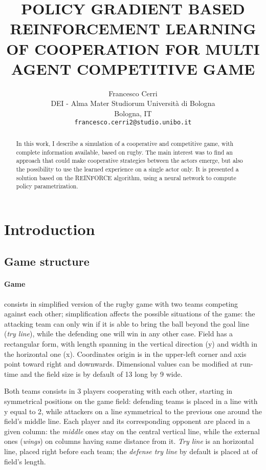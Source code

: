 \documentclass{article}
\title{POLICY GRADIENT BASED REINFORCEMENT LEARNING OF COOPERATION FOR  MULTI AGENT COMPETITIVE GAME}
\author{
  Francesco Cerri\\
  DEI - Alma Mater Studiorum Università di Bologna\\
  Bologna, IT\\
  \texttt{francesco.cerri2@studio.unibo.it} \\
}
\begin{document}
\maketitle

\begin{abstract}
In this work, I describe a simulation of a cooperative and competitive game, with complete information available, based on rugby. The main interest was to find an approach that could make cooperative strategies between the actors emerge, but also the possibility to use the learned experience on a single actor only. It is presented a solution based on the REINFORCE algorithm, using a neural network to compute policy parametrization.
\end{abstract}
\section{Introduction}
\label{intro}
\subsection{Game structure}
 \paragraph{Game}consists in simplified version of the rugby game with two teams competing against each other; simplification affects the possible situations of the game: the attacking team can only win if it is able to bring the ball beyond the goal line (\emph{try line}), while the defending one will win in any other case.
 Field has a rectangular form, with length spanning in the vertical direction (y) and width in the horizontal one (x). Coordinates origin is in the upper-left corner and axis point toward right and downwards.
 Dimensional values can be modified at run-time and the field size is by default of 13 long by 9 wide.
 
 Both teams consists in 3 players cooperating with each other, starting in symmetrical positions on the game field: defending teams is placed in a line with y equal to 2, while attackers on a line symmetrical to the previous one around the field's middle line. Each player and its corresponding opponent are placed in a given column: the \emph{middle} ones stay on the central vertical line, while the external ones (\emph{wings}) on columns having same distance from it.\newline
\emph{Try line} is an horizontal line, placed right before each team; the \emph{defense try line} by default is placed at  of field's length.
\end{document}
